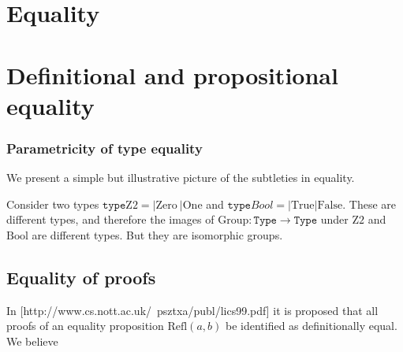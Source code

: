 \chapter{Equality}
\chapter{Definitional and propositional equality}



\subsection{Parametricity of type equality}

We present a simple but illustrative picture of the subtleties in equality.

Consider two types $\texttt{type} \mathrm{Z2} = | \mathrm{Zero}\ | \mathrm{One}$ and  $\texttt{type} Bool = | \mathrm{True} | \mathrm{False}$. These are different types, and therefore the images of $\mathrm{Group} : \texttt{Type} \rightarrow \texttt{Type}$ under $\mathrm{Z2}$ and $\mathrm{Bool}$ are different types. But they are isomorphic groups.


\section{Equality of proofs}

In [http://www.cs.nott.ac.uk/~psztxa/publ/lics99.pdf] it is proposed that all proofs of an equality proposition $\mathrm{Refl}(a,b)$ be identified as definitionally equal. We believe 
